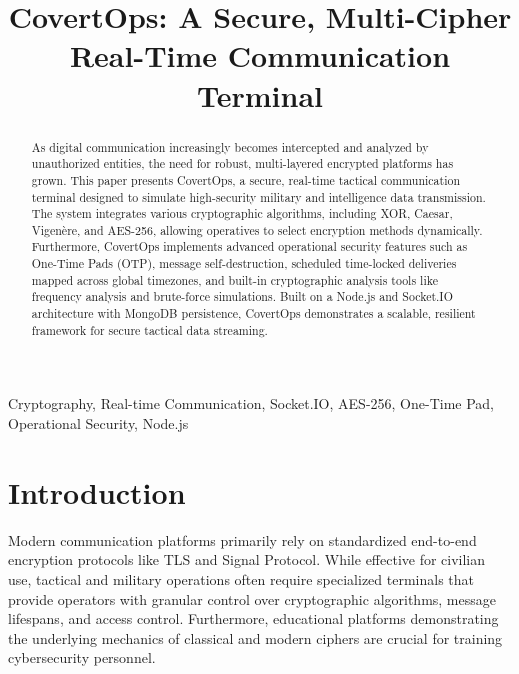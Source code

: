 \documentclass[conference]{IEEEtran}
\begin{document}
\title{CovertOps: A Secure, Multi-Cipher Real-Time Communication Terminal}

\author{
}

\maketitle

\begin{abstract}
As digital communication increasingly becomes intercepted and analyzed by unauthorized entities, the need for robust, multi-layered encrypted platforms has grown. This paper presents CovertOps, a secure, real-time tactical communication terminal designed to simulate high-security military and intelligence data transmission. The system integrates various cryptographic algorithms, including XOR, Caesar, Vigenère, and AES-256, allowing operatives to select encryption methods dynamically. Furthermore, CovertOps implements advanced operational security features such as One-Time Pads (OTP), message self-destruction, scheduled time-locked deliveries mapped across global timezones, and built-in cryptographic analysis tools like frequency analysis and brute-force simulations. Built on a Node.js and Socket.IO architecture with MongoDB persistence, CovertOps demonstrates a scalable, resilient framework for secure tactical data streaming.
\end{abstract}

\begin{IEEEkeywords}
Cryptography, Real-time Communication, Socket.IO, AES-256, One-Time Pad, Operational Security, Node.js
\end{IEEEkeywords}

\section{Introduction}
Modern communication platforms primarily rely on standardized end-to-end encryption protocols like TLS and Signal Protocol. While effective for civilian use, tactical and military operations often require specialized terminals that provide operators with granular control over cryptographic algorithms, message lifespans, and access control. Furthermore, educational platforms demonstrating the underlying mechanics of classical and modern ciphers are crucial for training cybersecurity personnel.
\end{document}
